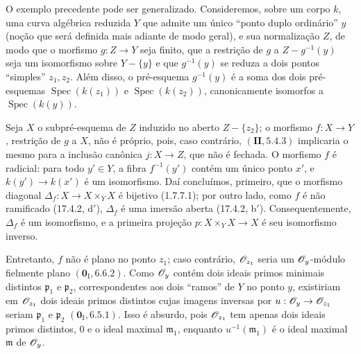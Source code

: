 \begin{env}[11.7.3]
\label{IV.11.7.3}
O exemplo precedente pode
ser generalizado. Consideremos,
sobre um corpo $k$, uma curva
algébrica reduzida $Y$ que
admite um único ``ponto duplo
ordinário'' $y$ (noção que
será definida mais adiante de
modo geral), e sua normalização
$Z$, de modo que o morfismo
$g:Z\to Y$ seja finito, que
a restrição de $g$ a
$Z-g^{-1}(y)$ seja um
isomorfismo sobre $Y-\{y\}$
e que $g^{-1}(y)$ se reduza
a dois pontos ``simples''
$z_1,z_2$. Além disso, o
pré-esquema $g^{-1}(y)$ é a
soma dos dois pré-esquemas
$\operatorname{Spec}(k(z_1))$
e $\operatorname{Spec}(k(z_2))$,
canonicamente isomorfos a
$\operatorname{Spec}(k(y))$.

Seja $X$ o subpré-esquema de
$Z$ induzido no aberto
$Z-\{z_2\}$; o morfismo
$f:X\to Y$, restrição de
$g$ a $X$, não é próprio,
pois, caso contrário,
$(\mathbf{II},5.4.3)$ implicaria
o mesmo para a inclusão
canônica $j:X\to Z$, que
não é fechada. O morfismo
$f$ é radicial: para todo
$y'\in Y$, a fibra
$f^{-1}(y')$ contém um único
ponto $x'$, e
$k(y')\to k(x')$ é um
isomorfismo. Daí concluímos,
primeiro, que o morfismo
diagonal $\Delta_f:X\to
X\times_Y X$ é bijetivo
(1.7.7.1); por outro
lado, como $f$ é não
ramificado (17.4.2, d$'$),
$\Delta_f$ é uma imersão
aberta (17.4.2, b$'$).
Consequentemente, $\Delta_f$
é um isomorfismo, e a primeira
projeção $p:X\times_Y X\to X$
é seu isomorfismo inverso.

Entretanto, $f$ não é plano
no ponto $z_1$; caso contrário,
$\mathscr{O}_{z_1}$ seria um
$\mathscr{O}_y$-módulo fielmente
plano $(\mathbf 0_{\mathrm I},6.6.2)$.
Como $\mathscr{O}_y$ contém dois
ideais primos minimais
distintos $\mathfrak p_1$
e $\mathfrak p_2$, correspondentes
aos dois ``ramos'' de $Y$ no
ponto $y$, existiriam em
$\mathscr{O}_{z_1}$ dois ideais
primos distintos cujas imagens
inversas por
$u:\sh{O}_y\to\sh{O}_{z_1}$
seriam $\mathfrak p_1$ e
$\mathfrak p_2$
$(\mathbf 0_{\mathrm I},6.5.1)$.
Isso é absurdo, pois
$\mathscr{O}_{z_1}$ tem apenas
dois ideais primos distintos,
$0$ e o ideal maximal
$\mathfrak m_1$, enquanto
$u^{-1}(\mathfrak m_1)$ é o
ideal maximal $\mathfrak m$
de $\mathscr{O}_y$.
\end{env}

